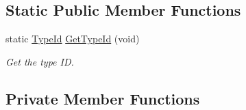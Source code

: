 \subsection*{Static Public Member Functions}
\begin{DoxyCompactItemize}
\item 
static \hyperlink{classns3_1_1TypeId}{Type\+Id} \hyperlink{classns3_1_1BSLinkManager_a0b5dbd537ba206248e84408a2d8484c8}{Get\+Type\+Id} (void)
\begin{DoxyCompactList}\small\item\em Get the type ID. \end{DoxyCompactList}\end{DoxyCompactItemize}
\subsection*{Private Member Functions}
